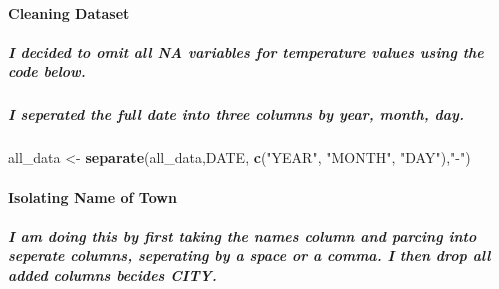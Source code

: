 \documentclass[]{article}
\newenvironment{Shaded}{\begin{snugshade}}{\end{snugshade}}
\newcommand{\KeywordTok}[1]{\textcolor[rgb]{0.13,0.29,0.53}{\textbf{#1}}}
\newcommand{\NormalTok}[1]{#1}
\newcommand{\OperatorTok}[1]{\textcolor[rgb]{0.81,0.36,0.00}{\textbf{#1}}}
\newcommand{\StringTok}[1]{\textcolor[rgb]{0.31,0.60,0.02}{#1}}
\let\oldparagraph\paragraph
\renewcommand{\paragraph}[1]{\oldparagraph{#1}\mbox{}}
\let\oldsubparagraph\subparagraph
\renewcommand{\subparagraph}[1]{\oldsubparagraph{#1}\mbox{}}
\begin{document}
\hypertarget{cleaning-dataset}{%
\paragraph{\texorpdfstring{\textbf{Cleaning
Dataset}}{Cleaning Dataset}}\label{cleaning-dataset}}

\hypertarget{i-decided-to-omit-all-na-variables-for-temperature-values-using-the-code-below.}{%
\subparagraph{I decided to omit all NA variables for temperature values
using the code
below.}\label{i-decided-to-omit-all-na-variables-for-temperature-values-using-the-code-below.}}

\begin{Shaded}
\end{Shaded}

\hypertarget{i-seperated-the-full-date-into-three-columns-by-year-month-day.}{%
\subparagraph{I seperated the full date into three columns by year,
month,
day.}\label{i-seperated-the-full-date-into-three-columns-by-year-month-day.}}

\begin{Shaded}
\begin{Highlighting}[]
\NormalTok{all_data <-}\StringTok{ }\KeywordTok{separate}\NormalTok{(all_data,DATE, }\KeywordTok{c}\NormalTok{(}\StringTok{"YEAR"}\NormalTok{, }\StringTok{"MONTH"}\NormalTok{, }\StringTok{"DAY"}\NormalTok{),}\StringTok{"-"}\NormalTok{)}
\end{Highlighting}
\end{Shaded}

\hypertarget{isolating-name-of-town}{%
\paragraph{\texorpdfstring{\textbf{Isolating Name of
Town}}{Isolating Name of Town}}\label{isolating-name-of-town}}

\hypertarget{i-am-doing-this-by-first-taking-the-names-column-and-parcing-into-seperate-columns-seperating-by-a-space-or-a-comma.-i-then-drop-all-added-columns-becides-city.}{%
\subparagraph{I am doing this by first taking the names column and
parcing into seperate columns, seperating by a space or a comma. I then
drop all added columns becides
CITY.}\label{i-am-doing-this-by-first-taking-the-names-column-and-parcing-into-seperate-columns-seperating-by-a-space-or-a-comma.-i-then-drop-all-added-columns-becides-city.}}
\end{document}
